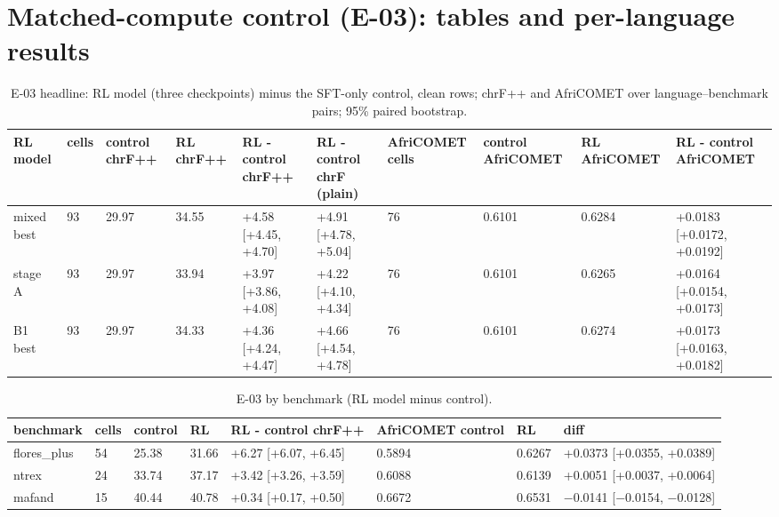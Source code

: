 



\section{Matched-compute control (E-03): tables and per-language results}\label{app:rlsft}

\begin{table}[t]
\centering\scriptsize
\setlength{\tabcolsep}{4pt}
\caption{E-03 headline: RL model (three checkpoints) minus the SFT-only control, clean rows; chrF++ and AfriCOMET over language--benchmark pairs; 95\% paired bootstrap.}\label{tab:e03-headline}
\begin{adjustbox}{max width=\linewidth}\begin{tabular}{@{}llllllllll@{}}
\toprule
RL model & cells & control chrF++ & RL chrF++ & RL - control chrF++ & RL - control chrF (plain) & AfriCOMET cells & control AfriCOMET & RL AfriCOMET & RL - control AfriCOMET \\
\midrule
mixed best & 93 & 29.97 & 34.55 & +4.58 [+4.45, +4.70] & +4.91 [+4.78, +5.04] & 76 & 0.6101 & 0.6284 & +0.0183 [+0.0172, +0.0192] \\
stage A & 93 & 29.97 & 33.94 & +3.97 [+3.86, +4.08] & +4.22 [+4.10, +4.34] & 76 & 0.6101 & 0.6265 & +0.0164 [+0.0154, +0.0173] \\
B1 best & 93 & 29.97 & 34.33 & +4.36 [+4.24, +4.47] & +4.66 [+4.54, +4.78] & 76 & 0.6101 & 0.6274 & +0.0173 [+0.0163, +0.0182] \\
\bottomrule
\end{tabular}\end{adjustbox}
\end{table}

\begin{table}[t]
\centering\footnotesize
\setlength{\tabcolsep}{4pt}
\caption{E-03 by benchmark (RL model minus control).}\label{tab:e03-bench}
\begin{adjustbox}{max width=\linewidth}\begin{tabular}{@{}llllllll@{}}
\toprule
benchmark & cells & control & RL & RL - control chrF++ & AfriCOMET control & RL & diff \\
\midrule
flores\_plus & 54 & 25.38 & 31.66 & +6.27 [+6.07, +6.45] & 0.5894 & 0.6267 & +0.0373 [+0.0355, +0.0389] \\
ntrex & 24 & 33.74 & 37.17 & +3.42 [+3.26, +3.59] & 0.6088 & 0.6139 & +0.0051 [+0.0037, +0.0064] \\
mafand & 15 & 40.44 & 40.78 & +0.34 [+0.17, +0.50] & 0.6672 & 0.6531 & \ensuremath{-}0.0141 [\ensuremath{-}0.0154, \ensuremath{-}0.0128] \\
\bottomrule
\end{tabular}\end{adjustbox}
\end{table}

